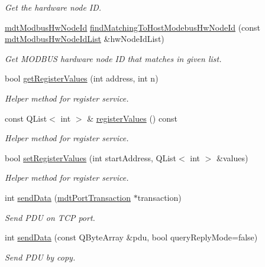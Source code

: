 \begin{DoxyCompactItemize}
\begin{DoxyCompactList}\small\item\em Get the hardware node I\-D. \end{DoxyCompactList}\item 
\hyperlink{classmdt_modbus_hw_node_id}{mdt\-Modbus\-Hw\-Node\-Id} \hyperlink{classmdt_modbus_tcp_port_manager_aefc317fd2714a81fabb6fef84251f73c}{find\-Matching\-To\-Host\-Modebus\-Hw\-Node\-Id} (const \hyperlink{classmdt_modbus_hw_node_id_list}{mdt\-Modbus\-Hw\-Node\-Id\-List} \&hw\-Node\-Id\-List)
\begin{DoxyCompactList}\small\item\em Get M\-O\-D\-B\-U\-S hardware node I\-D that matches in given list. \end{DoxyCompactList}\item 
bool \hyperlink{classmdt_modbus_tcp_port_manager_ab5e780409492b5f56326a870bc4262ec}{get\-Register\-Values} (int address, int n)
\begin{DoxyCompactList}\small\item\em Helper method for register service. \end{DoxyCompactList}\item 
const Q\-List$<$ int $>$ \& \hyperlink{classmdt_modbus_tcp_port_manager_a99a13b5250a8523aa63869991581e56a}{register\-Values} () const 
\begin{DoxyCompactList}\small\item\em Helper method for register service. \end{DoxyCompactList}\item 
bool \hyperlink{classmdt_modbus_tcp_port_manager_a746211413dfafb987a93145c9fa4876f}{set\-Register\-Values} (int start\-Address, Q\-List$<$ int $>$ \&values)
\begin{DoxyCompactList}\small\item\em Helper method for register service. \end{DoxyCompactList}\item 
int \hyperlink{classmdt_modbus_tcp_port_manager_a208a3b2522795974836fd8aef406725a}{send\-Data} (\hyperlink{classmdt_port_transaction}{mdt\-Port\-Transaction} $\ast$transaction)
\begin{DoxyCompactList}\small\item\em Send P\-D\-U on T\-C\-P port. \end{DoxyCompactList}\item 
int \hyperlink{classmdt_modbus_tcp_port_manager_ac6ffcccbba23b1bda5cba2ae347793ba}{send\-Data} (const Q\-Byte\-Array \&pdu, bool query\-Reply\-Mode=false)
\begin{DoxyCompactList}\small\item\em Send P\-D\-U by copy. \end{DoxyCompactList}\end{DoxyCompactItemize}
